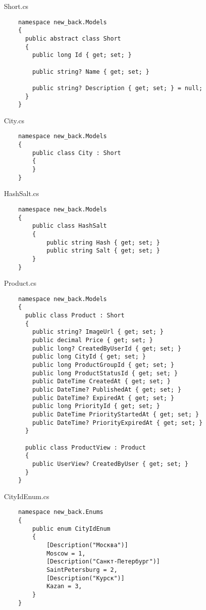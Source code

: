 Short.cs
\lstset{style=sharpc}
\begin{lstlisting}
    namespace new_back.Models
    {
      public abstract class Short
      {
        public long Id { get; set; }
    
        public string? Name { get; set; }
    
        public string? Description { get; set; } = null;
      }
    }
\end{lstlisting}

City.cs
\lstset{style=sharpc}
\begin{lstlisting}
    namespace new_back.Models
    {
        public class City : Short
        {
        }
    }
\end{lstlisting}

HashSalt.cs
\lstset{style=sharpc}
\begin{lstlisting}
    namespace new_back.Models
    {
        public class HashSalt
        {
            public string Hash { get; set; }
            public string Salt { get; set; }
        }
    }
\end{lstlisting}

Product.cs
\lstset{style=sharpc}
\begin{lstlisting}
    namespace new_back.Models
    {
      public class Product : Short
      {
        public string? ImageUrl { get; set; }
        public decimal Price { get; set; }
        public long? CreatedByUserId { get; set; }
        public long CityId { get; set; }
        public long ProductGroupId { get; set; }
        public long ProductStatusId { get; set; }
        public DateTime CreatedAt { get; set; }
        public DateTime? PublishedAt { get; set; }
        public DateTime? ExpiredAt { get; set; }
        public long PriorityId { get; set; }
        public DateTime PriorityStartedAt { get; set; }
        public DateTime? PriorityExpiredAt { get; set; }
      }
      
      public class ProductView : Product
      {
        public UserView? CreatedByUser { get; set; }
      }
    }
\end{lstlisting}

CityIdEnum.cs
\lstset{style=sharpc}
\begin{lstlisting}
    namespace new_back.Enums
    {
        public enum CityIdEnum
        {
            [Description("Москва")]
            Moscow = 1,
            [Description("Санкт-Петербург")]
            SaintPetersburg = 2,
            [Description("Курск")]
            Kazan = 3,
        }
    }    
\end{lstlisting}

